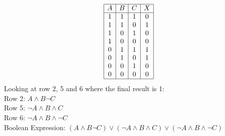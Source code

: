 \documentclass{article}
\begin{document}
\begin{enumerate}
\begin{figure}[!ht]
			\label{fig:my_label}
		\end{figure}

		\[
		\begin{array}{|c|c|c|c|}
			\hline
			A & B & C & X \\
			\hline
			1 & 1 & 1 & 0 \\
			1 & 1 & 0 & 1 \\
			1 & 0 & 1 & 0 \\
			1 & 0 & 0 & 0 \\
			0 & 1 & 1 & 1 \\
			0 & 1 & 0 & 1 \\
			0 & 0 & 1 & 0 \\
			0 & 0 & 0 & 0 \\
			\hline
		\end{array}
		\]
		Looking at row 2, 5 and 6 where the final result is 1: \\
		Row 2: $A \land B \neg C$ \\
		Row 5: $\neg A \land B \land C$ \\
		Row 6: $\neg A \land B \land \neg C$ \\
		Boolean Expression: $(A \land B \neg C)\lor (\neg A \land B \land C) \lor (\neg A \land B \land \neg C)$
		

\end{enumerate}
\end{document}
